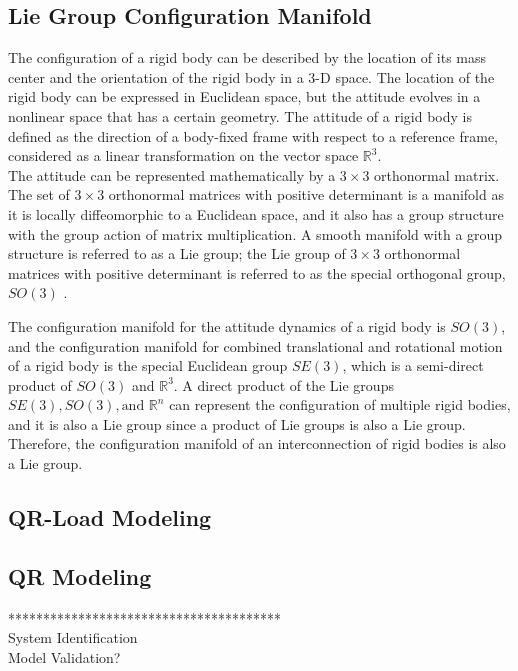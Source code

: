 \subsection{Lie Group Configuration Manifold} 
The configuration of a rigid body can be described by the location of its mass center and the orientation of the rigid body in a 3-D space. The location of the rigid body can be expressed in Euclidean space, but the attitude evolves in a nonlinear space that has a certain geometry. The attitude of a rigid body is defined as the direction of a body-fixed frame with respect to a reference frame, considered as a linear transformation on the vector space $ \mathbb{R}^3 $.\\
The attitude can be represented mathematically by a $ 3\times 3 $ orthonormal matrix. The set of $ 3\times3 $ orthonormal matrices with positive determinant is a manifold as it is locally diffeomorphic to a Euclidean space, and it also has a group structure with the group action of matrix multiplication. A smooth manifold with a group structure is referred to as a Lie group; the Lie group of $ 3\times 3 $ orthonormal matrices with positive determinant is referred to as the special orthogonal group, $ SO(3) $ \cite{Murray1994}.

The configuration manifold for the attitude dynamics of a rigid body is $ SO(3) $, and the configuration manifold for combined translational and rotational motion of a rigid body is the special Euclidean group $ SE(3) $, which is a semi-direct product of $ SO(3)  $ and $ \mathbb{R}^3 $. A direct product of the Lie groups $ SE(3), SO(3), \text{and } \mathbb{R}^n $ can represent the configuration of multiple rigid bodies, and it is also a Lie group since a product of Lie groups is also a Lie group. Therefore, the configuration manifold of an interconnection of rigid bodies is also a Lie group.


\subsection{QR-Load Modeling}	


\subsection{QR Modeling}	

***************************************\\
System Identification\\
Model Validation?\\

